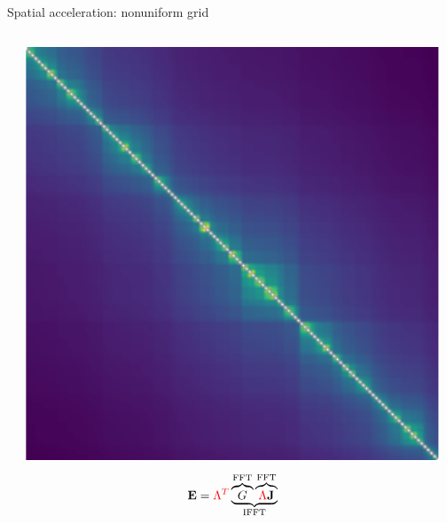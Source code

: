 \documentclass[aspectratio=169, usenames, dvipsnames]{beamer}
\begin{document}
\begin{frame}[b]{Spatial acceleration: nonuniform grid}
\begin{columns}
\begin{center}
      \end{center}

      \begin{center}
        \includegraphics[height=0.4\textheight]{figures/dense_1d}
        \begin{equation*}
          \vb{E} = \textcolor{red}{\Lambda^T} \underbrace{\overbrace{G}^\text{FFT} \overbrace{\textcolor{red}{\Lambda} \vb{J}}^\text{FFT}}_\text{IFFT}
        \end{equation*}
      \end{center}
  \end{columns}
\end{frame}
\end{document}
